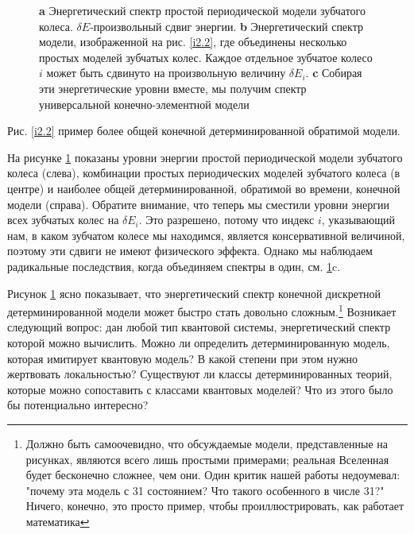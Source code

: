 \documentclass[main.tex]{subfiles}
\begin{document}
\begin{figure}[ht] %
	\begin{center}
		\caption{
		\label{i2.3} \textbf{a} Энергетический спектр простой периодической модели зубчатого колеса. $\delta E$-произвольный сдвиг энергии. \textbf{b} Энергетический спектр модели, изображенной на рис. \ref{i2.2}, где объединены несколько простых моделей зубчатых колес. Каждое отдельное зубчатое колесо $i$ может быть сдвинуто на произвольную величину $\delta E_i$. \textbf{c} Собирая эти энергетические уровни вместе, мы получим спектр универсальной конечно-элементной модели}
	\end {center}
\end {figure}

Рис. \ref{i2.2} пример более общей конечной детерминированной обратимой модели.

На рисунке \ref{i2.3} показаны уровни энергии простой периодической модели зубчатого колеса (слева), комбинации простых периодических моделей зубчатого колеса (в центре) и наиболее общей детерминированной, обратимой во времени, конечной модели (справа). Обратите внимание, что теперь мы сместили уровни энергии всех зубчатых колес на $\delta E_i$. Это разрешено, потому что индекс $i$, указывающий нам, в каком зубчатом колесе мы находимся, является консервативной величиной, поэтому эти сдвиги не имеют физического эффекта. Однако мы наблюдаем радикальные последствия, когда объединяем спектры в один, см. \ref{i2.3}c.

Рисунок \ref{i2.3} ясно показывает, что энергетический спектр конечной дискретной детерминированной модели может быстро стать довольно сложным.\footnote{Должно быть самоочевидно, что обсуждаемые модели, представленные на рисунках, являются всего лишь простыми примерами; реальная Вселенная будет бесконечно сложнее, чем они. Один критик нашей работы недоумевал: "почему эта модель с 31 состоянием? Что такого особенного в числе 31?" Ничего, конечно, это просто пример, чтобы проиллюстрировать, как работает математика} Возникает следующий вопрос: дан любой тип квантовой системы, энергетический спектр которой можно вычислить. Можно ли определить детерминированную модель, которая имитирует квантовую модель? В какой степени при этом нужно жертвовать локальностью? Существуют ли классы детерминированных теорий, которые можно сопоставить с классами квантовых моделей? Что из этого было бы потенциально интересно?
\end{document}
